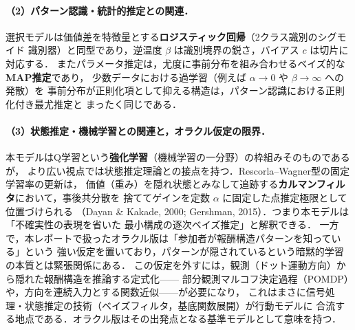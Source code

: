\documentclass[a4paper,11pt]{jsarticle}
\begin{document}
\paragraph{（2）パターン認識・統計的推定との関連．}
選択モデルは価値差を特徴量とする\textbf{ロジスティック回帰}（2クラス識別のシグモイド
識別器）と同型であり，逆温度 $\beta$ は識別境界の鋭さ，バイアス $c$ は切片に対応する．
またパラメータ推定は，尤度に事前分布を組み合わせるベイズ的な\textbf{MAP推定}であり，
少数データにおける過学習（例えば $\alpha \to 0$ や $\beta \to \infty$ への発散）を
事前分布が正則化項として抑える構造は，パターン認識における正則化付き最尤推定と
まったく同じである．

\paragraph{（3）状態推定・機械学習との関連と，オラクル仮定の限界．}
本モデルはQ学習という\textbf{強化学習}（機械学習の一分野）の枠組みそのものであるが，
より広い視点では状態推定理論との接点を持つ．Rescorla--Wagner型の固定学習率の更新は，
価値（重み）を隠れ状態とみなして追跡する\textbf{カルマンフィルタ}において，事後共分散を
捨ててゲインを定数 $\alpha$ に固定した点推定極限として位置づけられる
（Dayan \& Kakade, 2000; Gershman, 2015）．つまり本モデルは「不確実性の表現を省いた
最小構成の逐次ベイズ推定」と解釈できる．
一方で，本レポートで扱ったオラクル版は「参加者が報酬構造パターンを知っている」という
強い仮定を置いており，パターンが隠されているという暗黙的学習の本質とは緊張関係にある．
この仮定を外すには，観測（ドット運動方向）から隠れた報酬構造を推論する定式化——
部分観測マルコフ決定過程（POMDP）や，方向を連続入力とする関数近似——が必要になり，
これはまさに信号処理・状態推定の技術（ベイズフィルタ，基底関数展開）が行動モデルに
合流する地点である．オラクル版はその出発点となる基準モデルとして意味を持つ．
\end{document}
